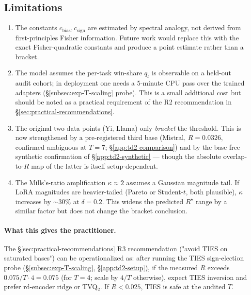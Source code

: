 \subsection{Limitations}
\label{app:td2-limitations}

\begin{enumerate}
\item The constants $c_{\mathrm{bias}}, c_{\mathrm{sign}}$ are
  estimated by spectral analogy, not derived from first-principles
  Fisher information. Future work would
  replace this with the exact Fisher-quadratic constants and produce a
  point estimate rather than a bracket.
\item The model assumes the per-task win-share $q_t$ is observable on
  a held-out audit cohort; in deployment one needs a 5-minute CPU pass
  over the trained adapters (\S\ref{subsec:exp-T-scaling} probe). This
  is a small additional cost but should be noted as a practical
  requirement of the R2 recommendation in \S\ref{sec:practical-recommendations}.
\item The original two data points (Yi, Llama) only \emph{bracket} the
  threshold. This is now strengthened by a pre-registered third base
  (Mistral, $R = 0.0326$, confirmed ambiguous at $T = 7$;
  \S\ref{app:td2-comparison}) and by the base-free synthetic
  confirmation of \S\ref{app:td2-synthetic} --- though the absolute
  overlap-to-$R$ map of the latter is itself setup-dependent.
\item The Mills's-ratio amplification $\kappa \approx 2$ assumes a
  Gaussian magnitude tail. If LoRA magnitudes are heavier-tailed
  (Pareto or Student-$t$, both plausible), $\kappa$ increases by
  $\sim 30\%$ at $\delta = 0.2$. This widens the predicted $R^\star$
  range by a similar factor but does not change the bracket
  conclusion.
\end{enumerate}

\paragraph{What this gives the practitioner.}
The §\ref{sec:practical-recommendations} R3 recommendation ("avoid
TIES on saturated bases") can be operationalized as: after running
the TIES sign-election probe (\S\ref{subsec:exp-T-scaling},
\S\ref{app:td2-setup}), if the measured $R$ exceeds $0.075/T \cdot 4 =
0.075$ (for $T = 4$; scale by $4/T$ otherwise), expect TIES inversion
and prefer rd-encoder ridge or TVQ$_2$. If $R < 0.025$, TIES is safe
at the audited $T$.

